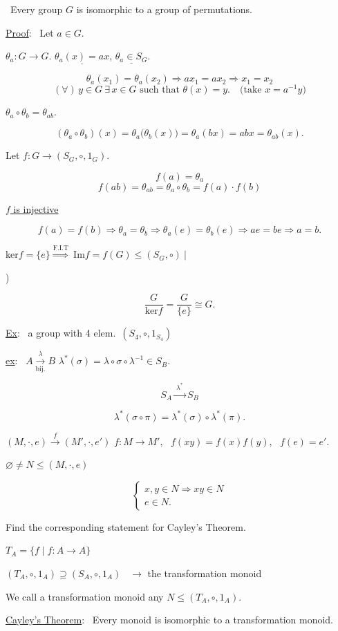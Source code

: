 \documentclass[12pt]{article}
\begin{document}
\noindent{} \ Every group $G$ is isomorphic to a group of permutations.

\bigskip
\noindent\underline{Proof}: \ Let $a\in G$.

\noindent $\theta_a: G\to G$. \quad $\underline{\theta_a(x)=ax}$, \quad $\underline{\theta_a\in S_G}$.

\[
\theta_a(x_1)=\theta_a(x_2) \Rightarrow ax_1=ax_2 \Rightarrow x_1=x_2
\]
\[
(\forall)\,y\in G \ \exists\,x\in G \text{ such that } \theta(x)=y. \quad \text{(take } x=a^{-1}y\text{)}
\]

\bigskip
\noindent\underline{$\theta_a\circ\theta_b = \theta_{ab}$}.

\[
(\theta_a\circ\theta_b)(x) = \theta_a\big(\theta_b(x)\big) = \theta_a(bx) = abx = \theta_{ab}(x).
\]

\bigskip
\noindent Let $f: G \to (S_G,\circ,1_G)$.

\[
f(a) = \theta_a
\]
\[
f(ab) = \theta_{ab} = \theta_a\circ\theta_b = f(a)\cdot f(b)
\]

\bigskip
\noindent\underline{$f$ is injective}

\[
f(a)=f(b) \Rightarrow \theta_a=\theta_b \Rightarrow \theta_a(e)=\theta_b(e) \Rightarrow ae=be \Rightarrow a=b.
\]

\bigskip
\noindent ker$f=\{e\} \overset{\text{F.I.T}}{\Longrightarrow} \ \text{Im}f = f(G) \leq (S_G,\circ) \ \Big|$

)

\[
\frac{G}{\text{ker}f} = \frac{G}{\{e\}} \cong G.
\]

\bigskip
\noindent\underline{Ex}: \ a group with 4 elem.\ $(S_4,\circ,1_{S_4})$

\bigskip
\noindent\underline{ex}: \ $A \xrightarrow[\text{bij.}]{\ \lambda\ } B$ \qquad $\lambda^*(\sigma) = \lambda\circ\sigma\circ\lambda^{-1} \in S_B$.

\[
S_A \xrightarrow{\ \lambda^*\ } S_B
\]

\[
\lambda^*(\sigma\circ\pi) = \lambda^*(\sigma)\circ\lambda^*(\pi).
\]

\bigskip
\noindent $(M,\cdot,e) \xrightarrow{\ f\ } (M',\cdot,e')$ \quad $f:M\to M'$, \ $f(xy)=f(x)f(y)$, \ $f(e)=e'$.

\bigskip
\noindent $\varnothing \neq N \leq (M,\cdot,e)$

\[
\begin{cases}
x,y\in N \Rightarrow xy\in N\\
e\in N.
\end{cases}
\]

\bigskip
\noindent Find the corresponding statement for Cayley's Theorem.

\bigskip
\noindent $T_A = \{f \mid f:A\to A\}$

\noindent $(T_A,\circ,1_A) \supseteq (S_A,\circ,1_A)$ \ $\to$ the transformation monoid

\bigskip
\noindent We call a transformation monoid any $N\leq (T_A,\circ,1_A)$.

\bigskip
\noindent\underline{Cayley's Theorem}: \ Every monoid is isomorphic to a transformation monoid.
\end{document}
